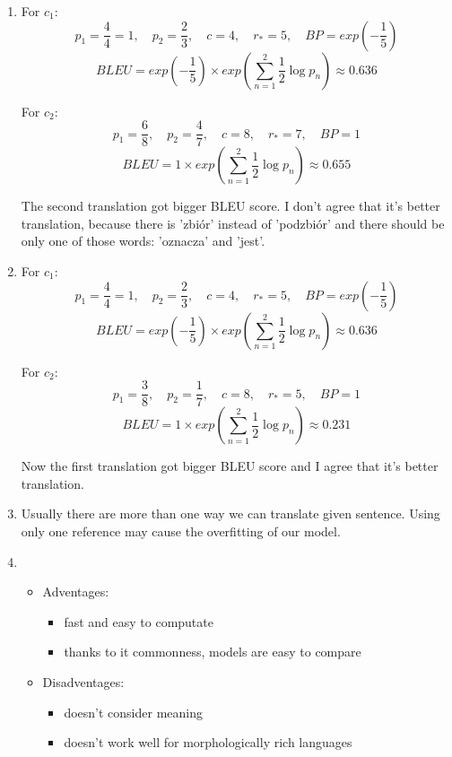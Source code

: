 \documentclass[12pt]{article}
\begin{document}
\begin{enumerate}
  \item For $c_1$:
            $$p_1 = \frac{4}{4} = 1, \quad p_2 = \frac{2}{3}, \quad c = 4, \quad r_*=5, \quad
             BP = exp(-\frac{1}{5})$$
             $$BLEU =  exp(-\frac{1}{5}) \times exp(\sum_{n=1}^2 \frac{1}{2} \log p_n) \approx 0.636$$
             
        For $c_2$:
            $$p_1 = \frac{6}{8}, \quad p_2 = \frac{4}{7}, \quad c = 8, \quad r_*=7, \quad
             BP = 1$$
             $$BLEU =  1 \times exp(\sum_{n=1}^2 \frac{1}{2} \log p_n) \approx 0.655$$
             
        The second translation got bigger BLEU score. I don't agree that it's better translation, because there is 'zbiór' instead of 'podzbiór' and there should be only one of those words: 'oznacza' and 'jest'. 
  \item For $c_1$:
            $$p_1 = \frac{4}{4} = 1, \quad p_2 = \frac{2}{3}, \quad c = 4, \quad r_*=5, \quad
             BP = exp(-\frac{1}{5})$$
             $$BLEU =  exp(-\frac{1}{5}) \times exp(\sum_{n=1}^2 \frac{1}{2} \log p_n) \approx 0.636$$
             
        For $c_2$:
            $$p_1 = \frac{3}{8}, \quad p_2 = \frac{1}{7}, \quad c = 8, \quad r_*=5, \quad
             BP = 1$$
             $$BLEU =  1 \times exp(\sum_{n=1}^2 \frac{1}{2} \log p_n) \approx 0.231$$
             
        Now the first translation got bigger BLEU score and I agree that it's better translation.
        
  \item  Usually there are more than one way we can translate given sentence. Using only one reference may cause the overfitting of our model.
  
  \item 
  \begin{itemize}
    \item Adventages:
    \begin{itemize}
      \item fast and easy to computate
      \item thanks to it commonness, models are easy to compare
    \end{itemize}
    
    \item Disadventages:
    \begin{itemize}
      \item doesn't consider meaning
      \item doesn't work well for morphologically rich languages
    \end{itemize}
  \end{itemize}
  
\end{enumerate}



 
\end{document}
